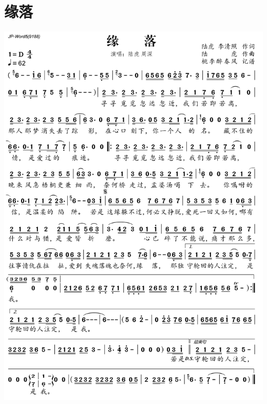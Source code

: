 \documentclass[cn,pad,twocol]{elegantbook}
\begin{document}
\section{缘落}\includegraphics[width=\textwidth]{rpi400/20210124缘落.png}
\end{document}
